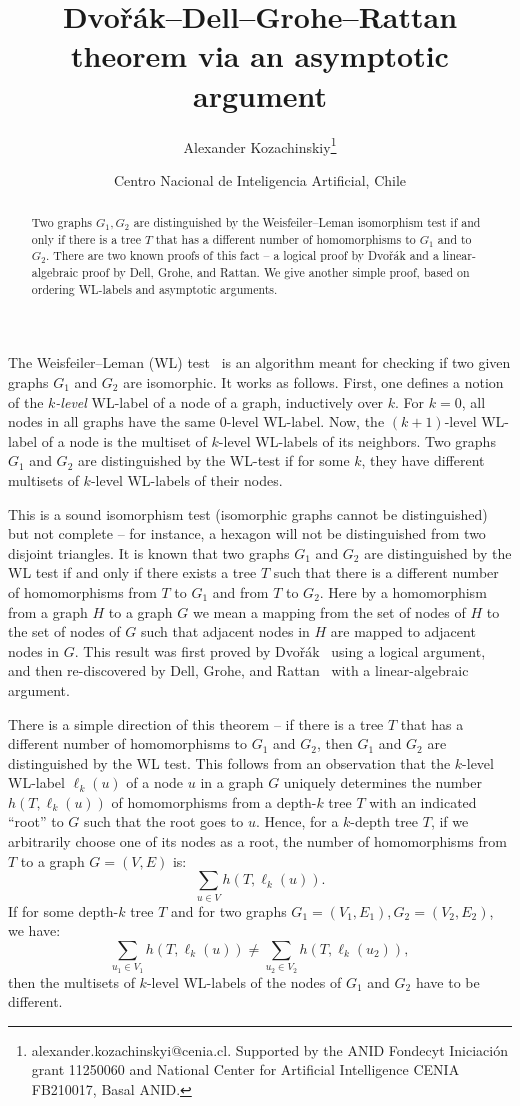 \documentclass{article}
\title{Dvo{\v{r}}{\'a}k--Dell--Grohe--Rattan theorem via an asymptotic argument}
\author{ Alexander Kozachinskiy\footnote{alexander.kozachinskyi@cenia.cl. Supported by the ANID Fondecyt Iniciación grant 11250060 and National
Center for Artificial Intelligence CENIA FB210017, Basal ANID.} }
\date{Centro Nacional de Inteligencia Artificial, Chile
}
\begin{document}
\maketitle
\begin{abstract}
   Two graphs $G_1,G_2$ are distinguished by the Weisfeiler--Leman isomorphism test if and only if there is a tree $T$ that has a different number of homomorphisms to $G_1$ and to $G_2$. There are two known proofs of this fact -- a logical proof by Dvo{\v{r}}{\'a}k and a linear-algebraic proof by  Dell, Grohe, and Rattan.   We give another simple proof, based on ordering WL-labels and asymptotic arguments.
\end{abstract}


The Weisfeiler--Leman (WL) test~\cite{weisfeiler1968reduction} is an algorithm meant for checking if two given graphs $G_1$ and $G_2$ are isomorphic. It works as follows. First, one defines a notion of the \emph{$k$-level} WL-label of a node of a graph, inductively over $k$. For $k = 0$, all nodes in all graphs have the same $0$-level WL-label. Now, the $(k+1)$-level WL-label of a node is the multiset of $k$-level WL-labels of its neighbors. Two graphs $G_1$ and $G_2$ are distinguished by the WL-test if for some $k$, they have different multisets of $k$-level WL-labels of their nodes.

This is a sound isomorphism test (isomorphic graphs cannot be distinguished) but not complete -- for instance, a hexagon will not be distinguished from two disjoint triangles. It is known that two graphs $G_1$ and $G_2$ are distinguished by the WL test if and only if there exists a tree $T$  such that there is a different number of homomorphisms from $T$ to $G_1$ and from $T$ to $G_2$. Here by a homomorphism from a graph $H$ to a graph $G$ we mean a mapping from the set of nodes of $H$ to the set of nodes of $G$ such that adjacent nodes in $H$ are mapped to adjacent nodes in $G$. This result was first proved by Dvo{\v{r}}{\'a}k~\cite{dvovrak2010recognizing} using a logical argument, and then re-discovered by Dell, Grohe, and Rattan~\cite{dell2018lovasz} with a linear-algebraic argument.

There is a simple direction of this theorem -- if there is a tree $T$ that has a different number of homomorphisms to $G_1$ and $G_2$, then $G_1$ and $G_2$ are distinguished by the WL test. This follows from an observation that the $k$-level WL-label $\ell_k(u)$ of a node $u$ in a graph $G$ uniquely determines the number $h(T,\ell_k(u))$ of homomorphisms from a depth-$k$ tree $T$ with an indicated ``root'' to $G$ such that the root goes to $u$. Hence, for a $k$-depth tree $T$, if we arbitrarily choose one of its nodes as a root, the number of homomorphisms from $T$ to a graph $G = (V, E)$ is:
\[\sum\limits_{u\in V} h(T,\ell_k(u)).\]
If for some depth-$k$ tree $T$ and for two graphs $G_1 = (V_1, E_1), G_2 = (V_2, E_2)$, we have:
\[\sum\limits_{u_1\in V_1} h(T,\ell_k(u)) \neq \sum\limits_{u_2\in V_2} h(T,\ell_k(u_2)),\]
then the multisets of $k$-level WL-labels of the nodes of $G_1$ and $G_2$ have to be different.
\end{document}
